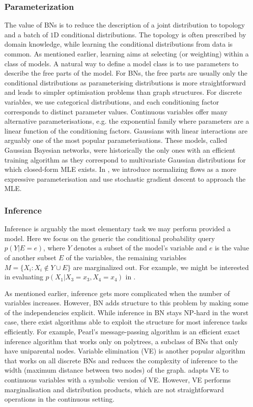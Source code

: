 \subsubsection{Parameterization}
The value of BNs is to reduce the description of a joint distribution to topology and a batch of $1$D conditional distributions. The topology is often prescribed by domain knowledge, while learning the conditional distributions from data is common. As mentioned earlier, learning aims at selecting (or weighting) within a class of models. A natural way to define a model class is to use parameters to describe the free parts of the model. For BNs, the free parts are usually only the conditional distributions as parameterising distributions is more straightforward and leads to simpler optimisation problems than graph structures. For discrete variables, we use categorical distributions, and each conditioning factor corresponds to distinct parameter values. Continuous variables offer many alternative parameterisations, e.g. the exponential family where parameters are a linear function of the conditioning factors. Gaussians with linear interactions are arguably one of the most popular parameterisations. These models, called Gaussian Bayesian networks, were historically the only ones with an efficient training algorithm as they correspond to multivariate Gaussian distributions \citep{wermuth1980linear} for which closed-form MLE exists. In , we introduce normalizing flows as a more expressive parameterisation and use stochastic gradient descent to approach the MLE.
\subsubsection{Inference}
Inference is arguably the most elementary task we may perform provided a model. Here we focus on the generic the conditional probability query $p(Y|E=e)$, where $Y$ denotes a subset of the model's variable and $e$ is the value of another subset $E$ of the variables, the remaining variables $M = \{X_i: X_i \notin Y \cup E \}$ are marginalized out. For example, we might be interested in evaluating $p(X_1|X_3=x_3, X_4=x_4)$ in .

As mentioned earlier, inference gets more complicated when the number of variables increases. However, BN adds structure to this problem by making some of the independencies explicit. While inference in BN stays NP-hard in the worst case, there exist algorithms able to exploit the structure for most inference tasks efficiently. For example, Pearl's message-passing algorithm is an efficient exact inference algorithm that works only on polytrees, a subclass of BNs that only have uniparental nodes. Variable elimination (VE) is another popular algorithm that works on all discrete BNs and reduces the complexity of inference to the width (maximum distance between two nodes) of the graph. \citet{sanner2012symbolic} adapts VE to continuous variables with a symbolic version of VE. However, VE performs marginalisation and distribution products, which are not straightforward operations in the continuous setting.

